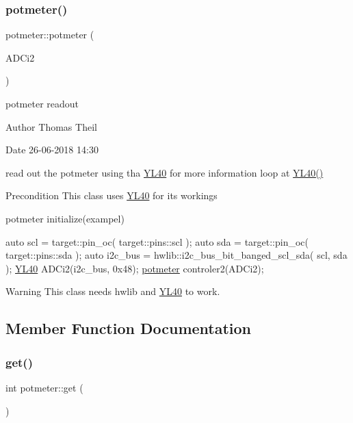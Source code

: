 \subsubsection{\texorpdfstring{potmeter()}{potmeter()}}
{\footnotesize\ttfamily potmeter\+::potmeter (\begin{DoxyParamCaption}\item[{\mbox{\hyperlink{class_y_l40}{Y\+L40}} \&}]{A\+D\+Ci2 }\end{DoxyParamCaption})}



potmeter readout 

\begin{DoxyAuthor}{Author}
Thomas Theil 
\end{DoxyAuthor}
\begin{DoxyDate}{Date}
26-\/06-\/2018 14\+:30
\end{DoxyDate}
read out the potmeter using tha \mbox{\hyperlink{class_y_l40}{Y\+L40}} for more information loop at \mbox{\hyperlink{class_y_l40}{Y\+L40()}}

\begin{DoxyPrecond}{Precondition}
This class uses \mbox{\hyperlink{class_y_l40}{Y\+L40}} for its workings 
\end{DoxyPrecond}
potmeter initialize(exampel) 
\begin{DoxyCode}
\textcolor{keyword}{auto} scl     = target::pin\_oc( target::pins::scl );
\textcolor{keyword}{auto} sda      = target::pin\_oc( target::pins::sda );
\textcolor{keyword}{auto} i2c\_bus = hwlib::i2c\_bus\_bit\_banged\_scl\_sda( scl, sda );
\mbox{\hyperlink{class_y_l40}{YL40}} ADCi2(i2c\_bus, 0x48);
\mbox{\hyperlink{classpotmeter}{potmeter}} controler2(ADCi2);
\end{DoxyCode}


\begin{DoxyWarning}{Warning}
This class needs hwlib and \mbox{\hyperlink{class_y_l40}{Y\+L40}} to work. 
\end{DoxyWarning}


\subsection{Member Function Documentation}
\mbox{\label{classpotmeter_a9184480674fac846504a03a77036dd71}} 
\subsubsection{\texorpdfstring{get()}{get()}}
{\footnotesize\ttfamily int potmeter\+::get (\begin{DoxyParamCaption}{ }\end{DoxyParamCaption})\hspace{0.3cm}{\ttfamily [virtual]}}



